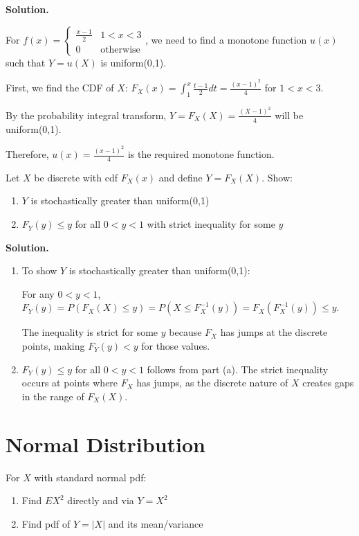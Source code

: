 \noindent\textbf{Solution.}

For $f(x) = \begin{cases} \frac{x-1}{2} & 1<x<3 \\ 0 & \text{otherwise} \end{cases}$, we need to find a monotone function $u(x)$ such that $Y=u(X)$ is uniform(0,1).

First, we find the CDF of $X$:
$F_X(x) = \int_1^x \frac{t-1}{2}dt = \frac{(x-1)^2}{4}$ for $1 < x < 3$.

By the probability integral transform, $Y = F_X(X) = \frac{(X-1)^2}{4}$ will be uniform(0,1).

Therefore, $u(x) = \frac{(x-1)^2}{4}$ is the required monotone function.

\begin{problembox}
Let $X$ be discrete with cdf $F_X(x)$ and define $Y=F_X(X)$. Show:
\begin{enumerate}[label=(\alph*)]
    \item $Y$ is stochastically greater than uniform(0,1)
    \item $F_Y(y) \leq y$ for all $0<y<1$ with strict inequality for some $y$
\end{enumerate}
\end{problembox}

\noindent\textbf{Solution.}
\begin{enumerate}[label=(\alph*)]
    \item To show $Y$ is stochastically greater than uniform(0,1):
    
    For any $0 < y < 1$, $F_Y(y) = P(F_X(X) \leq y) = P(X \leq F_X^{-1}(y)) = F_X(F_X^{-1}(y)) \leq y$.
    
    The inequality is strict for some $y$ because $F_X$ has jumps at the discrete points, making $F_Y(y) < y$ for those values.
    
    \item $F_Y(y) \leq y$ for all $0 < y < 1$ follows from part (a). The strict inequality occurs at points where $F_X$ has jumps, as the discrete nature of $X$ creates gaps in the range of $F_X(X)$.
\end{enumerate}

\section{Normal Distribution}

\begin{problembox}
For $X$ with standard normal pdf:
\begin{enumerate}[label=(\alph*)]
    \item Find $EX^2$ directly and via $Y=X^2$
    \item Find pdf of $Y=|X|$ and its mean/variance
\end{enumerate}
\end{problembox}

